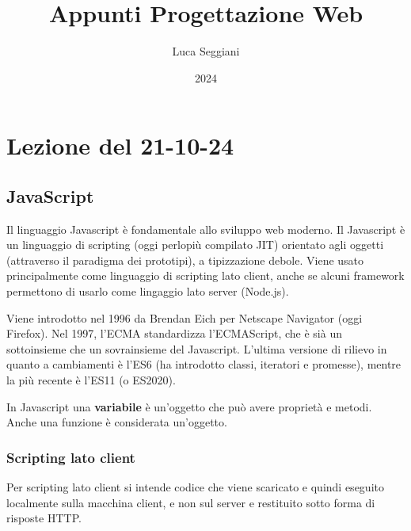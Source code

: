 \documentclass[a4paper,11pt]{article}
\title{Appunti Progettazione Web}
\author{Luca Seggiani}
\date{2024}
\begin{document}
\section{Lezione del 21-10-24}

\thispagestyle{empty}
\pagestyle{fancy}

\lstset{language=javascript, style=codestyle}

\subsection{JavaScript}
Il linguaggio Javascript è fondamentale allo sviluppo web moderno.
Il Javascript è un linguaggio di scripting (oggi perlopiù compilato JIT) orientato agli oggetti (attraverso il paradigma dei prototipi), a tipizzazione debole.
Viene usato principalmente come linguaggio di scripting lato client, anche se alcuni framework permettono di usarlo come lingaggio lato server (Node.js).

Viene introdotto nel 1996 da Brendan Eich per Netscape Navigator (oggi Firefox).
Nel 1997, l'ECMA standardizza l'ECMAScript, che è sià un sottoinsieme che un sovrainsieme del Javascript.
L'ultima versione di rilievo in quanto a cambiamenti è l'ES6 (ha introdotto classi, iteratori e promesse), mentre la più recente è l'ES11 (o ES2020).

In Javascript una \textbf{variabile} è un'oggetto che può avere proprietà e metodi.
Anche una funzione è considerata un'oggetto.

\subsubsection{Scripting lato client}
Per scripting lato client si intende codice che viene scaricato e quindi eseguito localmente sulla macchina client, e non sul server e restituito sotto forma di risposte HTTP.
\end{document}
